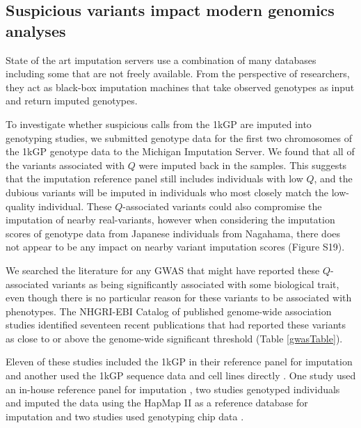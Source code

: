 \documentclass[9pt,article]{template}
\begin{document}
\subsection{Suspicious variants impact modern genomics analyses}

State of the art imputation servers use a combination of many databases including some that are not freely available.
From the perspective of researchers, they act as black-box imputation machines that take observed genotypes as input and return imputed genotypes.  

To investigate whether suspicious calls from the 1kGP are imputed into genotyping studies, we submitted genotype data for the first two chromosomes of the 1kGP genotype data to the Michigan Imputation Server.
We found that all of the variants associated with $Q$ were imputed back in the samples.
This suggests that the imputation reference panel still includes individuals with low $Q$, and the dubious variants will be imputed in individuals who most closely match the low-quality individual.
These $Q$-associated variants could also compromise the imputation of nearby real-variants, however when considering the imputation scores of genotype data from Japanese individuals from Nagahama, there does not appear to be any impact on nearby variant imputation scores (Figure S19). %

We searched the literature for any GWAS that might have reported these $Q$-associated variants as being significantly associated with some biological trait, even though there is no particular reason for these variants to be associated with phenotypes.
The NHGRI-EBI Catalog of published genome-wide association studies identified seventeen recent publications that had reported these variants as close to or above the genome-wide significant threshold (Table \ref{gwasTable}).

Eleven of these studies included the 1kGP in their reference panel for imputation \citep{xu2012genome, lutz2015genome, park2015mercapturic, astle2016allelic, herold2016family,  suhre2017connecting, lopez2017genome, tian2017genome,  spracklen2017association,  nagy2017exploration, gao2018genome} and another used the 1kGP sequence data and cell lines directly \citep{Mandage2017}.
One study used an in-house reference panel for imputation \citep{nishida2018key}, two studies genotyped individuals and imputed the data using the HapMap II as a reference  database for imputation \citep{Kraja2011, Ebejer2013} and two studies used genotyping chip data \citep{yucesoy2015genome, ellinghaus2016analysis}. 
\end{document}
